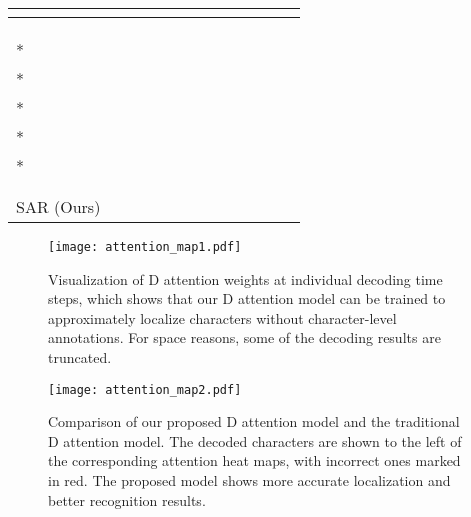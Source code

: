 \documentclass[letterpaper]{article} \usepackage{aaai19}  \usepackage{times}  \usepackage{helvet}  \usepackage{courier}  \usepackage{url}  \usepackage{graphicx}  \usepackage{amsmath}
\begin{document}
\begin{table*}[ht!]
\begin{center}
{\begin{tabular}{l|c|c|c|c|c|c|c|c|c|c|c|c}
				\hline
				\cite{OCRNIPS17} &  &  &   &   &  &  &  &  &  &  &   \\
				\hline
				\cite{shiCVPR2016} &  &  &   &   &  &  &  &  &  &  &  &    \\
				\hline
				\cite{BMVC2016_43} &  &  &   &   &  &  &  &  &  &  &   \\
				\hline
				\cite{ShiBY15} &  &  &   &   &  &  &  &  &  &  &  &    \\
				\hline
				\cite{ijcai2017}* &  &  &   &   &  &  &  &  &  &  &  &    \\
				\hline
				\cite{Cheng2017}* &  &  &   &   &  &  &  &  &  &  &  &    \\
				\hline
				\cite{SqueezeText18}* &  &  &   &   &  &  &  &  &  &  &   \\
				\hline
				\cite{Liu2018CharNetAC}* &  &  &   &   &  &  &  &  &  &  &  &   \\
				\hline
				\cite{cheng_EditDistance}* &  &  &   &   &  &  &  &  &  &  &   \\
				\hline
				\cite{Cheng2018AON} &  &  &   &   &  &  &  &  &  &  &   \\
				\hline
				\cite{shiPAMI2018} &  &  &   &   &  &  &  &  &  &  &   \\
				\hline
				\hline
				SAR (Ours) &  &  &   &   &  &   &   &  &  &   &  &   \\
				\hline
			\end{tabular}
		}
	\end{center}
\end{table*}

\begin{figure*}[th!]
	\begin{center}
		\texttt{[image: attention\_map1.pdf]}
	\end{center}
	\caption{
		Visualization of D attention weights at individual decoding time steps, which shows that our D attention model can be trained to approximately localize characters without character-level annotations. For space reasons, some of the decoding results are truncated.
	}
	\label{fig:visualization}

\end{figure*}

\begin{figure*}[t!]
	\begin{center}
		\texttt{[image: attention\_map2.pdf]}
	\end{center}
	\caption{Comparison of our proposed D attention model and the traditional D attention model.
		The decoded characters are shown to the left of the corresponding attention heat maps, with incorrect ones marked in red.
		The proposed model shows more accurate localization and better recognition results.
	}
	\label{fig:2atten}
\end{figure*}
\end{document}
